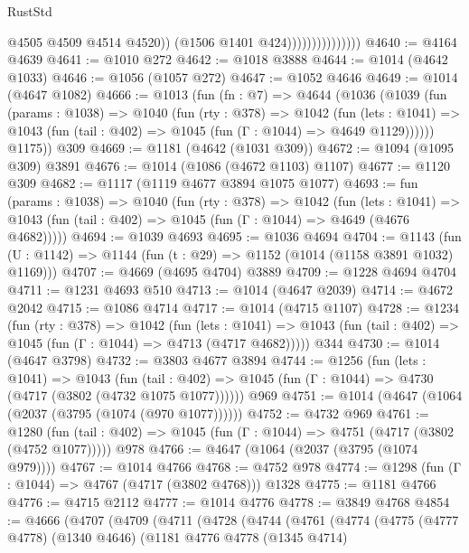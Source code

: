 \begin{lexlean}{RustStd}
\begin{coremodule}
                                    @4505
                                    @4509
                                    @4514
                                    @4520))
                                (@1506 @1401 @424)))))))))))))))
@4640 := @4164 @4639
@4641 := @1010 @272
@4642 := @1018 @3888
@4644 := @1014 (@4642 @1033)
@4646 := @1056 (@1057 @272)
@4647 := @1052 @4646
@4649 := @1014 (@4647 @1082)
@4666 := @1013
    (fun (fn : @7) =>
    @4644
      (@1036
        (@1039
          (fun (params : @1038) =>
          @1040
            (fun (rty : @378) =>
            @1042
              (fun (lets : @1041) =>
              @1043 (fun (tail : @402) => @1045 (fun (Γ : @1044) => @4649 @1129))))))
        @1175))
    @309
@4669 := @1181 (@4642 (@1031 @309))
@4672 := @1094 (@1095 @309) @3891
@4676 := @1014 (@1086 (@4672 @1103) @1107)
@4677 := @1120 @309
@4682 := @1117 (@1119 @4677 @3894 @1075 @1077)
@4693 := fun (params : @1038) =>
  @1040
    (fun (rty : @378) =>
    @1042
      (fun (lets : @1041) =>
      @1043 (fun (tail : @402) => @1045 (fun (Γ : @1044) => @4649 (@4676 @4682)))))
@4694 := @1039 @4693
@4695 := @1036 @4694
@4704 := @1143 (fun (U : @1142) => @1144 (fun (t : @29) => @1152 (@1014 (@1158 @3891 @1032) @1169)))
@4707 := @4669 (@4695 @4704) @3889
@4709 := @1228 @4694 @4704
@4711 := @1231 @4693 @510
@4713 := @1014 (@4647 @2039)
@4714 := @4672 @2042
@4715 := @1086 @4714
@4717 := @1014 (@4715 @1107)
@4728 := @1234
    (fun (rty : @378) =>
    @1042
      (fun (lets : @1041) =>
      @1043 (fun (tail : @402) => @1045 (fun (Γ : @1044) => @4713 (@4717 @4682)))))
    @344
@4730 := @1014 (@4647 @3798)
@4732 := @3803 @4677 @3894
@4744 := @1256
    (fun (lets : @1041) =>
    @1043
      (fun (tail : @402) => @1045 (fun (Γ : @1044) => @4730 (@4717 (@3802 (@4732 @1075 @1077))))))
    @969
@4751 := @1014 (@4647 (@1064 (@2037 (@3795 (@1074 (@970 @1077))))))
@4752 := @4732 @969
@4761 := @1280
    (fun (tail : @402) => @1045 (fun (Γ : @1044) => @4751 (@4717 (@3802 (@4752 @1077)))))
    @978
@4766 := @4647 (@1064 (@2037 (@3795 (@1074 @979))))
@4767 := @1014 @4766
@4768 := @4752 @978
@4774 := @1298 (fun (Γ : @1044) => @4767 (@4717 (@3802 @4768))) @1328
@4775 := @1181 @4766
@4776 := @4715 @2112
@4777 := @1014 @4776
@4778 := @3849 @4768
@4854 := @4666
    (@4707
      (@4709
        (@4711
          (@4728
            (@4744
              (@4761
                (@4774
                  (@4775
                    (@4777 @4778)
                    (@1340 @4646)
                    (@1181
                      @4776
                      @4778
                      (@1345 @4714)

\end{coremodule}
\end{lexlean}
